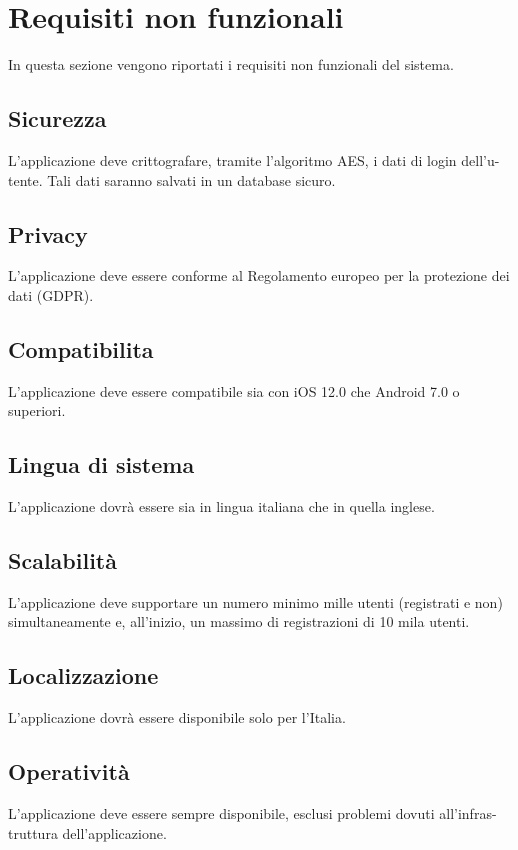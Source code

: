 \chapter{Requisiti non funzionali}
In questa sezione vengono riportati i requisiti non funzionali del sistema.

\section{Sicurezza}
L'applicazione deve crittografare, tramite l'algoritmo AES, i dati di login dell'u-tente. Tali dati saranno salvati in
un database sicuro.

\section{Privacy}
L'applicazione deve essere conforme al Regolamento europeo per la protezione dei dati (GDPR).

\section{Compatibilita} 
L'applicazione deve essere compatibile sia con iOS 12.0 che Android 7.0 o superiori.

\section{Lingua di sistema} 
L'applicazione dovrà essere sia in lingua italiana che in quella inglese.

\section{Scalabilità}
L'applicazione deve supportare un numero minimo mille utenti (registrati e non) simultaneamente e, all'inizio, un 
massimo di registrazioni di 10 mila utenti.

\section{Localizzazione} 
L'applicazione dovrà essere disponibile solo per l'Italia.

\section{Operatività} 
L'applicazione deve essere sempre disponibile, esclusi problemi dovuti all'infras-truttura dell'applicazione.

